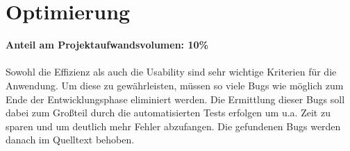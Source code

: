 \section{Optimierung}
\textbf{Anteil am Projektaufwandsvolumen: 10\%}\\ \\
Sowohl die Effizienz als auch die Usability sind sehr wichtige Kriterien für die Anwendung. Um diese zu gewährleisten, müssen so viele Bugs wie möglich zum Ende der Entwicklungsphase eliminiert werden. Die Ermittlung dieser Bugs soll dabei zum Großteil durch die automatisierten Tests erfolgen um u.a. Zeit zu sparen und um deutlich mehr Fehler abzufangen. Die gefundenen Bugs werden danach im Quelltext behoben. 
